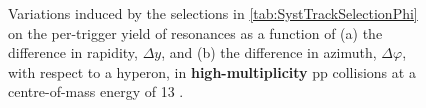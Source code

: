 \begin{figure}[!h]
\centering
{}
\centering
{}
\caption{Variations induced by the selections in \tab\ref{tab:SystTrackSelectionPhi} on the per-trigger yield of \rmPhiMes resonances as a function of (a) the difference in rapidity, $\Delta y$, and (b) the difference in azimuth, $\Delta \varphi$, with respect to a \rmXi hyperon, in \textbf{high-multiplicity} pp collisions at a centre-of-mass energy of 13 \tev.}
	\label{fig:SystPerTriggerYieldXiRatioHMRsn}
\end{figure}

